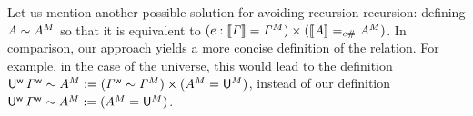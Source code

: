 Let us mention another possible solution for avoiding recursion-recursion:
defining $A\sim{A}^M$ so that it is equivalent to $(e:\llbracket\mathit{\Gamma}\rrbracket
= {\mathit{\Gamma}}^M)\times (\llbracket A\rrbracket = _{e\#}{A}^M)$.
In comparison, our approach
yields a more concise definition of the relation.
For example, in the case of the universe, this would lead
to the definition
  $  {\mathsf{U}}^{\mathsf{w}}\,{\mathit{\Gamma}}^{\mathsf{w}} \sim {A}^M := ({\mathit{\Gamma}}^{\mathsf{w}}\sim{\mathit{\Gamma}}^M) \times ({A}^M = {\mathsf{U}}^M)$,
  instead of
  our definition
  $  {\mathsf{U}}^{\mathsf{w}}\,{\mathit{\Gamma}}^{\mathsf{w}} \sim {A}^M := ({A}^M = {\mathsf{U}}^M)$.



